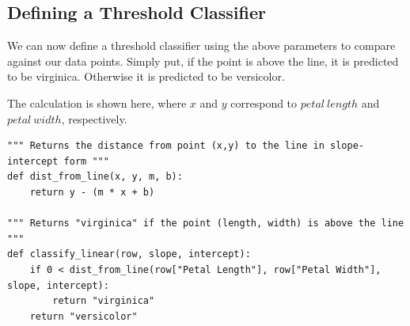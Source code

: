 \documentclass[letterpaper]{article}
\begin{document}
\subsection{Defining a Threshold Classifier}

We can now define a threshold classifier using the above parameters to compare
against our data points. Simply put, if the point is above the line, it is
predicted to be virginica. Otherwise it is predicted to be versicolor.

The calculation is shown here, where $x$ and $y$ correspond to $petal\ length$
and $petal\ width$, respectively.
\begin{verbatim}
""" Returns the distance from point (x,y) to the line in slope-intercept form """
def dist_from_line(x, y, m, b):
    return y - (m * x + b)

""" Returns "virginica" if the point (length, width) is above the line """
def classify_linear(row, slope, intercept):
    if 0 < dist_from_line(row["Petal Length"], row["Petal Width"], slope, intercept):
        return "virginica"
    return "versicolor"
\end{verbatim}
\end{document}
